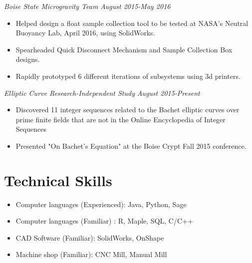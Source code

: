 \documentclass[letterpaper]{article}
\begin{document}
\vspace{.05in}
\begin{multicols}{2}
\textit{Boise State Microgravity Team}
\vfill
\columnbreak
\textit{August 2015-May 2016}
\end{multicols}
\begin{itemize}
    \item Helped design a float sample collection tool to be tested at NASA's Neutral Buoyancy Lab, April 2016, using SolidWorks.
    \item Spearheaded Quick Disconnect Mechanism and Sample Collection Box designs. 
	\item Rapidly prototyped 6 different iterations of subsystems using 3d printers.
\end{itemize}

\vspace{.05in}
\begin{multicols}{2}
\textit{Elliptic Curve Research-Independent Study}
\vfill
\columnbreak
\textit{August 2015-Present}
\end{multicols}
\begin{itemize}
    \item Discovered 11 integer sequences related to the Bachet elliptic curves over prime finite fields that are not in the Online Encyclopedia of Integer Sequences
    \item Presented "On Bachet's Equation" at the Boise Crypt Fall 2015 conference.
\end{itemize}

\section*{Technical Skills}
\begin{itemize}
\item Computer languages (Experienced): Java, Python, Sage 
\item Computer languages (Familiar) : R, Maple, SQL, C/C++
\item CAD Software (Familiar): SolidWorks, OnShape
\item Machine shop (Familiar): CNC Mill, Manual Mill
\end{itemize}
\end{document}
